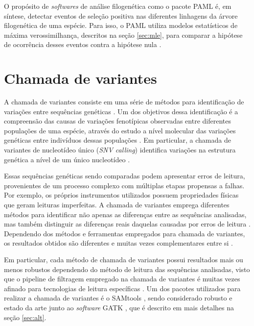 \documentclass[cic,tc]{iiufrgs}
\begin{document}
O propósito de \textit{softwares} de análise filogenética como o pacote PAML é, em
síntese, detectar eventos de seleção positiva nas diferentes linhagens da
árvore filogenética de uma espécie. Para isso, o PAML utiliza modelos
estatísticos de máxima verossimilhança, descritos na seção \ref{sec:mle}, para
comparar a hipótese de ocorrência desses eventos contra a hipótese nula
\cite{moretti2012gcodeml}.

\section{Chamada de variantes}
\label{sec:call}

A chamada de variantes consiste em uma série de métodos para identificação de
variações entre sequências genéticas \cite{nielsen2011genotype}. Um dos
objetivos dessa identificação é a compreensão das causas de variações
fenotípicas observadas entre diferentes populações de uma espécie, através do
estudo a nível molecular das variações genéticas entre indivíduos dessas
populações \cite{jiang2019population}. Em particular, a chamada de variantes de
nucleotídeo único (\textit{SNV calling}) identifica variações na estrutura
genética a nível de um único nucleotídeo \cite{khurana2016role}.

Essas sequências genéticas sendo comparadas podem apresentar erros de leitura,
provenientes de um processo complexo com múltiplas etapas propensas a falhas.
Por exemplo, os próprios instrumentos utilizados possuem propriedades físicas
que geram leituras imperfeitas. A chamada de variantes emprega diferentes
métodos para identificar não apenas as diferenças entre as sequências
analisadas, mas também distinguir as diferenças reais daquelas causadas por
erros de leitura \cite{poplin2018universal}. Dependendo dos métodos e
ferramentas empregados para chamada de variantes, os resultados obtidos são
diferentes e muitas vezes complementares entre
si \cite{hwang2015systematic} \cite{gezsi2015variantmetacaller} \cite{guo2015seqmule}.

Em particular, cada método de chamada de variantes possui resultados mais ou
menos robustos dependendo do método de leitura das sequências analisadas, visto
que o pipeline de filtragem empregado na chamada de variantes é muitas vezes
afinado para tecnologias de leitura específicas \cite{poplin2018universal}. Um
dos pacotes utilizados para realizar a chamada de variantes é o
SAMtools \cite{pirooznia2014validation}, sendo considerado robusto e estado da
arte junto ao \textit{software}
GATK \cite{crysnanto2019accurate} \cite{hwang2015systematic}
\cite{yao2020evaluation} \cite{poplin2018universal}, que é descrito em mais
detalhes na seção \ref{sec:alt}.
\end{document}

